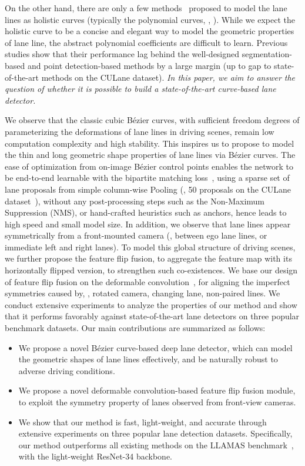 \documentclass[10pt,twocolumn,letterpaper]{article}
\begin{document}
On the other hand, there are only a few methods~\cite{tabelini2021polylanenet,liu2021end} proposed to model the lane lines as holistic curves (typically the polynomial curves, \eg, ).
While we expect the holistic curve to be a concise and elegant way to model the geometric properties of lane line, the abstract polynomial coefficients are difficult to learn. Previous studies show that their performance lag behind the well-designed segmentation-based and point detection-based methods by a large margin (up to  gap to state-of-the-art methods on the CULane \cite{pan2018spatial} dataset).
\textit{In this paper, we aim to answer the question of whether it is possible to build a state-of-the-art curve-based lane detector.
}


We observe that the classic cubic Bézier curves, with sufficient freedom degrees of parameterizing the deformations of lane lines in driving scenes, remain low computation complexity and high stability.
This inspires us to propose to model the thin and long geometric shape properties of lane lines via Bézier curves. 
The ease of optimization from on-image Bézier control points enables the network to be end-to-end learnable with the bipartite matching loss~\cite{wang2021end}, using a sparse set of lane proposals from simple column-wise Pooling (\eg, 50 proposals on the CULane dataset~\cite{pan2018spatial}), without any post-processing steps such as the Non-Maximum Suppression (NMS), or hand-crafted heuristics such as anchors, hence leads to high speed and small model size.
In addition, we observe that lane lines appear symmetrically from a front-mounted camera (\eg, between ego lane lines, or immediate left and right lanes). To model this global structure of driving scenes,
we further propose the feature flip fusion, to aggregate the feature map with its horizontally flipped version, to strengthen such co-existences. 
We base our design of feature flip fusion on the deformable convolution~\cite{zhu2019deformable},
for aligning the imperfect symmetries caused by, \eg, rotated camera, changing lane, non-paired lines.
We conduct extensive experiments to analyze the properties of our method and show that it performs favorably against state-of-the-art lane detectors on three popular benchmark datasets. Our main contributions are summarized as follows:


\begin{itemize}
    \item We propose a novel Bézier curve-based deep lane detector, which can model the geometric shapes of lane lines effectively, and be naturally robust to adverse driving conditions.
    \item We propose a novel deformable convolution-based feature flip fusion module, to exploit the symmetry property of lanes observed from front-view cameras.
    \item We show that our method is fast, light-weight, and accurate through extensive experiments on three popular lane detection datasets.
    Specifically, our method outperforms all existing methods on the LLAMAS benchmark~\cite{llamas2019}, with the light-weight ResNet-34 backbone.
\end{itemize}
\end{document}
